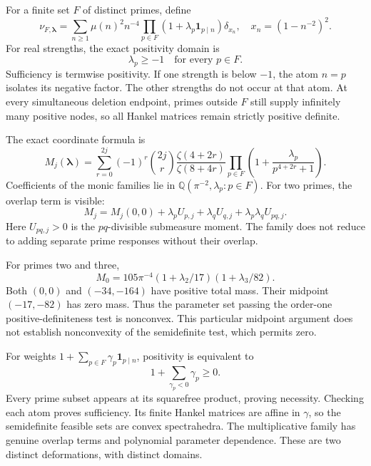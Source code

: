 For a finite set $F$ of distinct primes, define
\[
\nu_{F,\boldsymbol\lambda}
=\sum_{n\ge1}\mu(n)^2n^{-4}
\prod_{p\in F}(1+\lambda_p\mathbf1_{p\mid n})\delta_{x_n},
\quad x_n=(1-n^{-2})^2.
\]
For real strengths, the exact positivity domain is
\[
\boxed{\lambda_p\ge-1\quad\text{for every }p\in F.}
\]
Sufficiency is termwise positivity. If one strength is below $-1$, the
atom $n=p$ isolates its negative factor. The other strengths do not occur
at that atom. At every simultaneous deletion endpoint, primes outside
$F$ still supply infinitely many positive nodes, so all Hankel matrices
remain strictly positive definite.

The exact coordinate formula is
\[
M_j(\boldsymbol\lambda)=\sum_{r=0}^{2j}(-1)^r\binom{2j}{r}
\frac{\zeta(4+2r)}{\zeta(8+4r)}
\prod_{p\in F}\left(1+\frac{\lambda_p}{p^{4+2r}+1}\right).
\]
Coefficients of the monic families lie in
$\mathbb Q(\pi^{-2},\lambda_p:p\in F)$.
For two primes, the overlap term is visible:
\[
M_j=M_j(0,0)+\lambda_pU_{p,j}+\lambda_qU_{q,j}
+\lambda_p\lambda_qU_{pq,j}.
\]
Here $U_{pq,j}>0$ is the $pq$-divisible submeasure moment. The family
does not reduce to adding separate prime responses without their overlap.

For primes two and three,
\[
M_0=105\pi^{-4}(1+\lambda_2/17)(1+\lambda_3/82).
\]
Both $(0,0)$ and $(-34,-164)$ have positive total mass. Their midpoint
$(-17,-82)$ has zero mass. Thus the parameter set passing the order-one
positive-definiteness test is nonconvex. This particular midpoint argument
does not establish nonconvexity of the semidefinite test, which permits zero.

For weights $1+\sum_{p\in F}\gamma_p\mathbf1_{p\mid n}$, positivity is
equivalent to
\[
1+\sum_{\gamma_p<0}\gamma_p\ge0.
\]
Every prime subset appears at its squarefree product, proving necessity.
Checking each atom proves sufficiency. Its finite Hankel matrices are affine
in $\gamma$, so the semidefinite feasible sets are convex spectrahedra.
The multiplicative family has genuine overlap terms and polynomial parameter
dependence. These are two distinct deformations, with distinct domains.

